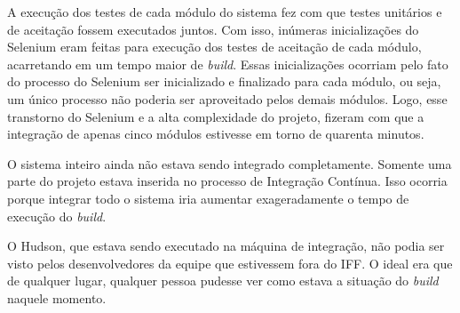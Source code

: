 A execução dos testes de cada módulo do sistema fez com que testes unitários e de aceitação fossem executados juntos. Com isso, inúmeras inicializações do Selenium eram feitas para execução dos testes de aceitação de cada módulo, acarretando em um tempo maior de \textit{build}. Essas inicializações ocorriam pelo fato do processo do Selenium ser inicializado e finalizado para cada módulo, ou seja, um único processo não poderia ser aproveitado pelos demais módulos. Logo, esse transtorno do Selenium e a alta complexidade do projeto, fizeram com que a integração de apenas cinco módulos estivesse em torno de quarenta minutos.

O sistema inteiro ainda não estava sendo integrado completamente. Somente uma parte do projeto estava inserida no processo de Integração Contínua. Isso ocorria porque integrar todo o sistema iria aumentar exageradamente o tempo de execução do \textit{build}.

O Hudson, que estava sendo executado na máquina de integração, não podia ser visto pelos desenvolvedores da equipe que estivessem fora do IFF. O ideal era que de qualquer lugar, qualquer pessoa pudesse ver como estava a situação do \textit{build} naquele momento.
